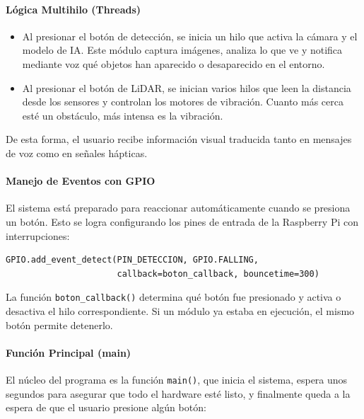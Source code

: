\documentclass[12pt,a4paper]{article}
\begin{document}
\paragraph{Lógica Multihilo (Threads)}
  
\begin{itemize}
El programa aprovecha la librería threading para ejecutar varias tareas al mismo tiempo.
    \item Al presionar el botón de detección, se inicia un hilo que activa la cámara y el modelo de IA. Este módulo captura imágenes, analiza lo que ve y notifica mediante voz qué objetos han aparecido o desaparecido en el entorno.
    \item Al presionar el botón de LiDAR, se inician varios hilos que leen la distancia desde los sensores y controlan los motores de vibración. Cuanto más cerca esté un obstáculo, más intensa es la vibración.
\end{itemize}

De esta forma, el usuario recibe información visual traducida tanto en mensajes de voz como en señales hápticas.

\paragraph{Manejo de Eventos con GPIO}
\begin{itemize}
El sistema está preparado para reaccionar automáticamente cuando se presiona un botón. Esto se logra configurando los pines de entrada de la Raspberry Pi con interrupciones:
\end{itemize}

\begin{verbatim}
GPIO.add_event_detect(PIN_DETECCION, GPIO.FALLING, 
                      callback=boton_callback, bouncetime=300)
\end{verbatim}

La función \texttt{boton\_callback()} determina qué botón fue presionado y activa o desactiva el hilo correspondiente. Si un módulo ya estaba en ejecución, el mismo botón permite detenerlo.

\paragraph{Función Principal (main)}


El núcleo del programa es la función \texttt{main()}, que inicia el sistema, espera unos segundos para asegurar que todo el hardware esté listo, y finalmente queda a la espera de que el usuario presione algún botón:
\end{document}

